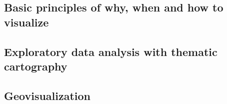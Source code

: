 \subsection{Basic principles of why, when and how to visualize}
\label{s:basics}


\subsection{Exploratory data analysis with thematic cartography}
\label{s:eda}


\subsection{Geovisualization}


















